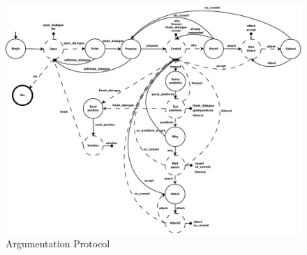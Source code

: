 \begin{figure}[ht]
  \centering
    \includegraphics[width=.9\linewidth]{ProgrammingAgents/images/ArgCAgentGraph.pdf}
  \caption{Argumentation Protocol}
\label{fig:protocol}
\end{figure}

